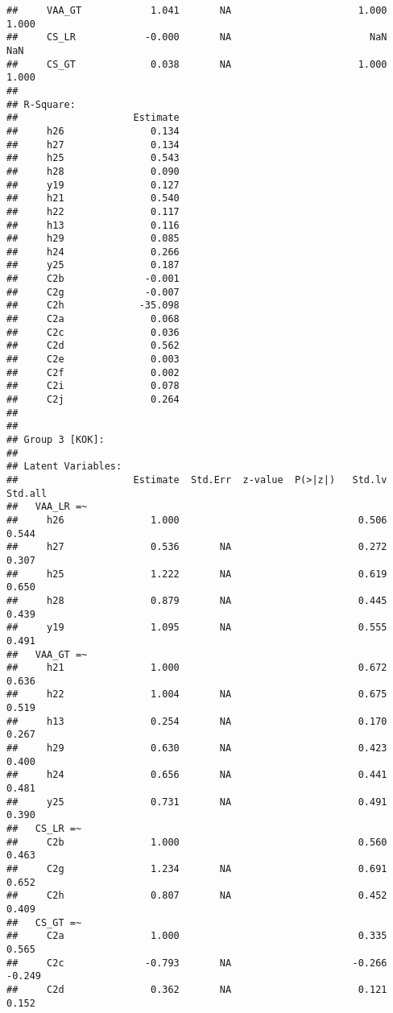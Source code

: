 \documentclass[
]{article}
\begin{document}
\begin{verbatim}
##     VAA_GT            1.041       NA                      1.000    1.000
##     CS_LR            -0.000       NA                        NaN      NaN
##     CS_GT             0.038       NA                      1.000    1.000
## 
## R-Square:
##                    Estimate
##     h26               0.134
##     h27               0.134
##     h25               0.543
##     h28               0.090
##     y19               0.127
##     h21               0.540
##     h22               0.117
##     h13               0.116
##     h29               0.085
##     h24               0.266
##     y25               0.187
##     C2b              -0.001
##     C2g              -0.007
##     C2h             -35.098
##     C2a               0.068
##     C2c               0.036
##     C2d               0.562
##     C2e               0.003
##     C2f               0.002
##     C2i               0.078
##     C2j               0.264
## 
## 
## Group 3 [KOK]:
## 
## Latent Variables:
##                    Estimate  Std.Err  z-value  P(>|z|)   Std.lv  Std.all
##   VAA_LR =~                                                             
##     h26               1.000                               0.506    0.544
##     h27               0.536       NA                      0.272    0.307
##     h25               1.222       NA                      0.619    0.650
##     h28               0.879       NA                      0.445    0.439
##     y19               1.095       NA                      0.555    0.491
##   VAA_GT =~                                                             
##     h21               1.000                               0.672    0.636
##     h22               1.004       NA                      0.675    0.519
##     h13               0.254       NA                      0.170    0.267
##     h29               0.630       NA                      0.423    0.400
##     h24               0.656       NA                      0.441    0.481
##     y25               0.731       NA                      0.491    0.390
##   CS_LR =~                                                              
##     C2b               1.000                               0.560    0.463
##     C2g               1.234       NA                      0.691    0.652
##     C2h               0.807       NA                      0.452    0.409
##   CS_GT =~                                                              
##     C2a               1.000                               0.335    0.565
##     C2c              -0.793       NA                     -0.266   -0.249
##     C2d               0.362       NA                      0.121    0.152

\end{verbatim}
\end{document}

